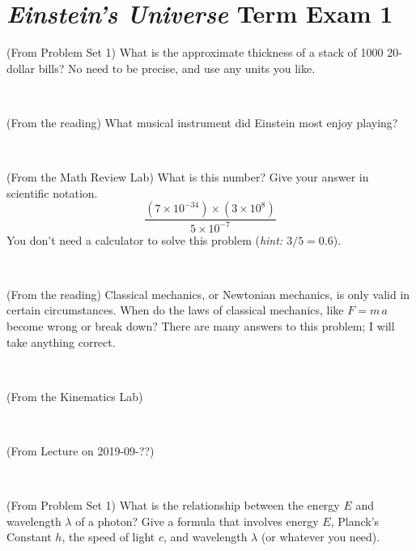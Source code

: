 \documentclass[12pt, letterpaper]{article}
\begin{document}
\section*{\textsl{Einstein's Universe} Term Exam 1}
\setcounter{problem}{1}


\begin{problem} (From Problem Set 1)
What is the approximate thickness of a stack of 1000 20-dollar bills?
No need to be precise, and use any units you like.
\end{problem}


\vfill ~

\begin{problem} (From the reading)
What musical instrument did Einstein most enjoy playing?
\end{problem}


\vfill ~

\begin{problem} (From the Math Review Lab)
What is this number? Give your answer in scientific notation.
$$
\frac{(7\times10^{-34})\times(3\times10^8)}{5\times10^{-7}}
$$
You don't need a calculator to solve this problem (\textit{hint: $3/5=0.6$}).
\end{problem}


\vfill ~

\begin{problem} (From the reading)
Classical mechanics, or Newtonian mechanics, is only valid in certain
circumstances. When do the laws of classical mechanics, like $F =
m\,a$ become wrong or break down? There are many answers to this
problem; I will take anything correct.
\end{problem}


\vfill ~


\clearpage


\begin{problem} (From the Kinematics Lab)

\end{problem}


\vfill ~

\begin{problem} (From Lecture on 2019-09-??)
\end{problem}


\vfill ~

\begin{problem} (From Problem Set 1)
What is the relationship between the energy $E$ and wavelength
$\lambda$ of a photon? Give a formula that involves energy $E$,
Planck's Constant $h$, the speed of light $c$, and wavelength
$\lambda$ (or whatever you need).
\end{problem}
\end{document}
